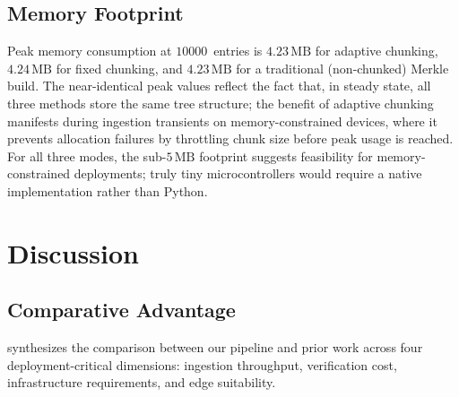 \documentclass[preprint,12pt]{elsarticle}
\begin{document}
\subsection{Memory Footprint}
\label{sec:memory}

Peak memory consumption at $10000$~entries is $4.23\,\mathrm{MB}$ for adaptive chunking, $4.24\,\mathrm{MB}$ for fixed chunking, and $4.23\,\mathrm{MB}$ for a traditional (non-chunked) Merkle build.
The near-identical peak values reflect the fact that, in steady state, all three methods store the same tree structure; the benefit of adaptive chunking manifests during ingestion transients on memory-constrained devices, where it prevents allocation failures by throttling chunk size before peak usage is reached.
For all three modes, the sub-$5\,\mathrm{MB}$ footprint suggests feasibility for memory-constrained deployments; truly tiny microcontrollers would require a native implementation rather than Python.



\section{Discussion}
\label{sec:discussion}

\subsection{Comparative Advantage}

 synthesizes the comparison between our pipeline and prior work across four deployment-critical dimensions: ingestion throughput, verification cost, infrastructure requirements, and edge suitability.
\end{document}

